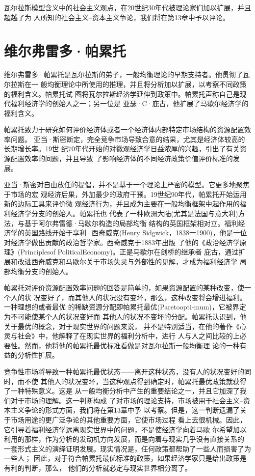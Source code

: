 瓦尔拉斯模型含义中的社会主义观点，在20世纪30年代被理论家们加以扩展，并且超越了为
人所知的社会主义--资本主义争论，我们将在第13章中予以评论。

\section{维尔弗雷多·帕累托}

维尔弗雷多·帕累托是瓦尔拉斯的弟子，一般均衡理论的早期支持者。他贯彻了瓦尔拉斯在一
般均衡理论中所使用的推理，并且将分析加以扩展，以考察不同政策的福利含义。帕累托试
图将瓦尔拉斯经济学延伸到政策中。帕累托声称自己是现代福利经济学的创始人之一；另一位是
亚瑟·C·庇古，他扩展了马歇尔经济学的福利含义。

帕累托致力于研究如何评价经济体或者一个经济体内部特定市场结构的资源配置效率问题。
亚当·斯密断定，完全竞争市场导致合意的结果，尤其是经济体较高的长期增长率。19世
纪70年代开始的对微观经济学日益浓厚的兴趣，引出了有关资源配置效率的间题，并且导致
了影响经济体的不同经济政策价值评价标准的发展。

亚当·斯密对自由放任的提倡，并不是基于一个理论上严密的模型。它更多地聚焦于市场的宏
观经济后果，外加最少的政府干预。19世纪90年代，帕累托开始运用新的边际工具来评价微
观经济行为，并且成为主要在一般均衡框架中起作用的福利经济学分支的创始人。帕累托也
代表了一种欧洲大陆(尤其是法国与意大利)方法，与基于阿尔弗雷德·马歇尔构造的局部均衡
结构的英国框架相对立。福利经济学的英国路线开始于享利·西奇威克(Henry
Sidgwick，1838一1900)，他是一位对经济学做出贡献的政治哲学家。西奇威克于1883年出版
了他的《政治经济学原理》(Principlesof PoliticalEconomy)。正是马歇尔在剑桥的继承者
庇古，通过扩展和改进西奇威克和马歇尔关于市场失灵与外部性的见解，才成为福利经济学
局部均衡分支的创始人。

帕累托对评价资源配置效率问题的回答是简单的，如果资源配置的某种改变，使一个人的状
况变好了，而其他人的状况没有变坏，那么，这种改变将会增进福利。一种理想的或者最优
的稀缺资源分配即帕累托最优(Paretoopti-mum)，它被界定为不可能使某个人的状况变好而
其他人的状况不变坏的分配。帕累托认识到，他关于最优的概念，对于现实世界的问题来说，
并不是特别适当，在他的著作《心灵与社会》中，他解释了在现实世界的福利分析中，进行
人与人之间比较的上必要性。然而，他将他的帕累托最优标准看做是对瓦尔拉斯一般均衡理
论的一种有益的分析性扩展。

竞争性市场将导致一种帕累托最优状态——离开这种状态，没有人的状况变好的同时，而不使
其他人的状况变坏，当这种观点得到确定时，帕累托最优政策就获得了一种特殊意义。这是
从一般均衡分析中产生的重要结论之一，并且它加深了我们对于市场的理解。这一判断构成
了对市场的理论支持，市场被用于社会主义--资本主义争论的形式方面，我们将在第13章中予
以考察。但是，这一判断遗漏了关于市场用途的更广泛争论的其他重要方面，它使市场过程
看上去很机械。因此，它引导着福利经济学远离现实世界中的问题，不是使经济学向着马歇
尔希望加以利用的那样，作为分析的发动机方向发展，而是向着与现实几乎没有直接关系的
一套形式主义的演绎证明发展。现实情况是，任何政策都帮助了一些人而损害了为一些人；
因此，对于符合帕累托最优标准的政策，如果经济学家只是给出政策是有利的判断，那么，
他们的分析就必定与现实世界相分离了。

